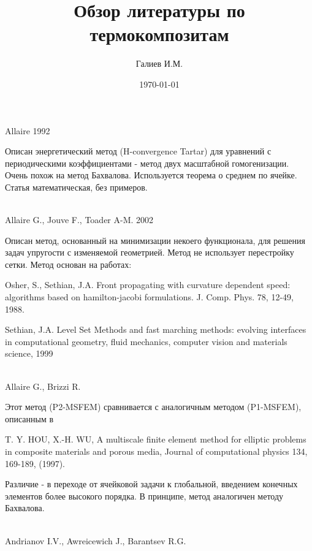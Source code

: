 \documentclass[12pt,a4paper]{article}
\author{Галиев И.М.}
\title{Обзор литературы по термокомпозитам}
\date{\today}
\begin{document}
\maketitle
\thispagestyle{empty} %

\tableofcontents %



\cite{Allaire1992} Allaire 1992

Описан энергетический метод (H-convergence Tartar) для уравнений с периодическими коэффициентами - метод двух масштабной гомогенизации. Очень похож на метод Бахвалова. Используется теорема о среднем по ячейке. Статья математическая, без примеров.

~\\
\cite{Allaire2002} Allaire G., Jouve F., Toader A-M. 2002

Описан метод, основанный на минимизации некоего функционала, для решения задач упругости с изменяемой геометрией. Метод не использует перестройку сетки. Метод основан на работах:
 
Osher, S., Sethian, J.A. Front propagating with curvature dependent speed: algorithms based on hamilton-jacobi formulations. J. Comp. Phys. 78, 12-49, 1988.

Sethian, J.A. Level Set Methods and fast marching methods: evolving interfaces in computational geometry, fluid
mechanics, computer vision and materials science, 1999

~\\
\cite{Allaire2004} Allaire G., Brizzi R.

Этот метод (P2-MSFEM) сравнивается с аналогичным методом (P1-MSFEM), описанным в

T. Y. HOU, X.-H. WU, A multiscale finite element method for elliptic problems in composite materials and porous media, Journal of computational physics 134, 169-189, (1997).

Различие - в переходе от ячейковой задачи к глобальной, введением конечных элементов более высокого порядка. В принципе, метод аналогичен методу Бахвалова. 

~\\
\cite{Andrianov2003} Andrianov I.V., Awreicewich J., Barantsev R.G.
\end{document}
